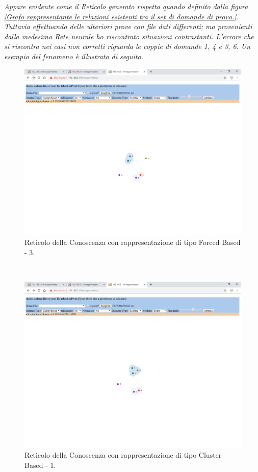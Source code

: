 \noindent
\textit{Appare evidente come il Reticolo generato rispetta quando definito dalla figura \ref{Grafo rappresentante le relazioni esistenti tra il set di domande di prova.}.\\
Tuttavia effettuando delle ulteriori prove con file dati differenti; ma provenienti dalla medesima Rete neurale ho riscontrato situazioni contrastanti. L'errore che si riscontra nei casi non corretti riguarda le coppie di domande 1, 4 e 3, 6. Un esempio del fenomeno \`e illustrato di seguito.}
\begin{figure}[H]
\centering
	\includegraphics[width=1\linewidth]{./image/reticoloNonCorretto1.png}
	\caption{Reticolo della Conoscenza con rappresentazione di tipo Forced Based - 3.}
	\label{Reticolo della Conoscenza con rappresentazione di tipo Forced Based - 3.}
\end{figure}
\noindent\\
\begin{figure}[H]
\centering
	\includegraphics[width=1\linewidth]{./image/reticoloNonCorretto2.png}
	\caption{Reticolo della Conoscenza con rappresentazione di tipo Cluster Based - 1.}
	\label{Reticolo della Conoscenza con rappresentazione di tipo Cluster Based - 1.}
\end{figure}
